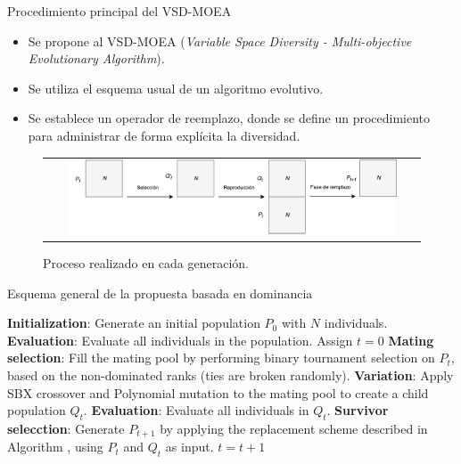 \documentclass{beamer}
\begin{document}
\begin{frame}{Procedimiento principal del VSD-MOEA}
\begin{itemize}
\justifying
\item Se propone al VSD-MOEA (\textit{Variable Space Diversity - Multi-objective Evolutionary Algorithm}).
\justifying
\item Se utiliza el esquema usual de un algoritmo evolutivo.
\justifying
\item Se establece un operador de reemplazo, donde se define un procedimiento para administrar de forma explícita la diversidad.
\end{itemize}
\begin{figure}
\centering
\begin{tabular}{c}
\includegraphics[width=0.9\textwidth]{Images/Evolution_Process.pdf}
\end{tabular}
\caption{Proceso realizado en cada generación.}
\label{fig:DiversityProposal}
\end{figure}
\end{frame}




\begin{frame}{Esquema general de la propuesta basada en dominancia}
    \begin{algorithm}[H]
    \begin{scriptsize}
	\caption{Main procedure of VSD-MOEA} 
	\begin{small}
\begin{algorithmic}[1]
 	\STATE \textbf{Initialization}: Generate an initial population $P_0$ with $N$ individuals.
	\STATE \textbf{Evaluation}: Evaluate all individuals in the population.
	\STATE Assign $t=0$
	   \STATE \textbf{Mating selection}: Fill the mating pool by performing binary tournament selection on $P_t$, 
		 based on the non-dominated ranks (ties are broken randomly).
	   \STATE \textbf{Variation}: Apply SBX crossover and Polynomial mutation to the mating pool to create a child population $Q_t$.
		 \STATE \textbf{Evaluation}: Evaluate all individuals in $Q_t$.
	   \STATE \textbf{Survivor selecction}: Generate $P_{t+1}$ by applying the replacement scheme 
		 described in Algorithm , using $P_t$ and $Q_t$ as input.
	   \STATE $t=t+1$
	\ENDWHILE
	\end{algorithmic}
	\end{small}
\label{alg:vsd-moea}
\end{scriptsize}
\end{algorithm}
\end{frame}
\end{document}
